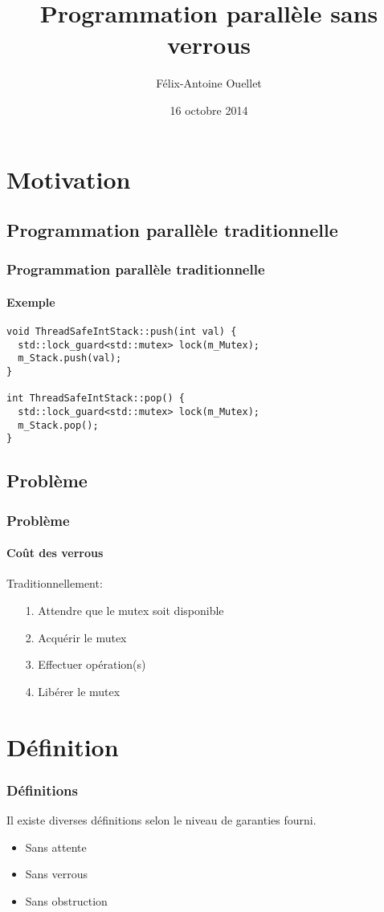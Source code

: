 \documentclass{beamer}
\author[Félix-Antoine Ouellet]{Félix-Antoine Ouellet}
\title[Lock-free\hspace{2em}\insertframenumber/\inserttotalframenumber]{Programmation parallèle sans verrous}
\institute{Université de Sherbrooke}
\date{16 octobre 2014}
\begin{document}
\begin{frame}
\titlepage %
\end{frame}

\begin{frame}
\tableofcontents[hideallsubsections]
\end{frame}

\section{Motivation}
\subsection{Programmation parallèle traditionnelle}
\begin{frame}[fragile]
\frametitle{Programmation parallèle traditionnelle}
\framesubtitle{Exemple}
\begin{lstlisting}
void ThreadSafeIntStack::push(int val) {
  std::lock_guard<std::mutex> lock(m_Mutex);
  m_Stack.push(val);
}

int ThreadSafeIntStack::pop() {
  std::lock_guard<std::mutex> lock(m_Mutex);
  m_Stack.pop();
}
\end{lstlisting}
\end{frame}

\subsection{Problème}
\begin{frame}
\frametitle{Problème}
\framesubtitle{Coût des verrous}
Traditionnellement:
\begin{itemize}
\item[1.] Attendre que le mutex soit disponible
\item[2.] Acquérir le mutex
\item[3.] Effectuer opération(s)
\item[4.] Libérer le mutex
\end{itemize}
\end{frame}

\section{Définition}
\begin{frame}
\frametitle{Définitions}
Il existe diverses définitions selon le niveau de garanties fourni.
\begin{itemize}
\item Sans attente
\item Sans verrous
\item Sans obstruction
\end{itemize}
\end{frame}
\end{document}
